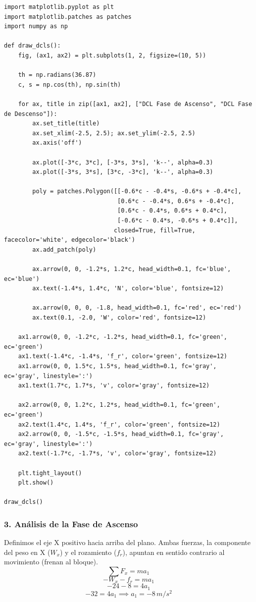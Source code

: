 \documentclass[12pt, a4paper]{article}
\begin{document}
\begin{lstlisting}
import matplotlib.pyplot as plt
import matplotlib.patches as patches
import numpy as np

def draw_dcls():
    fig, (ax1, ax2) = plt.subplots(1, 2, figsize=(10, 5))
    
    th = np.radians(36.87)
    c, s = np.cos(th), np.sin(th)
    
    for ax, title in zip([ax1, ax2], ["DCL Fase de Ascenso", "DCL Fase de Descenso"]):
        ax.set_title(title)
        ax.set_xlim(-2.5, 2.5); ax.set_ylim(-2.5, 2.5)
        ax.axis('off')
        
        ax.plot([-3*c, 3*c], [-3*s, 3*s], 'k--', alpha=0.3)
        ax.plot([-3*s, 3*s], [3*c, -3*c], 'k--', alpha=0.3)
        
        poly = patches.Polygon([[-0.6*c - -0.4*s, -0.6*s + -0.4*c], 
                                [0.6*c - -0.4*s, 0.6*s + -0.4*c], 
                                [0.6*c - 0.4*s, 0.6*s + 0.4*c], 
                                [-0.6*c - 0.4*s, -0.6*s + 0.4*c]], 
                               closed=True, fill=True, facecolor='white', edgecolor='black')
        ax.add_patch(poly)
        
        ax.arrow(0, 0, -1.2*s, 1.2*c, head_width=0.1, fc='blue', ec='blue')
        ax.text(-1.4*s, 1.4*c, 'N', color='blue', fontsize=12)
        
        ax.arrow(0, 0, 0, -1.8, head_width=0.1, fc='red', ec='red')
        ax.text(0.1, -2.0, 'W', color='red', fontsize=12)
        
    ax1.arrow(0, 0, -1.2*c, -1.2*s, head_width=0.1, fc='green', ec='green')
    ax1.text(-1.4*c, -1.4*s, 'f_r', color='green', fontsize=12)
    ax1.arrow(0, 0, 1.5*c, 1.5*s, head_width=0.1, fc='gray', ec='gray', linestyle=':')
    ax1.text(1.7*c, 1.7*s, 'v', color='gray', fontsize=12)
    
    ax2.arrow(0, 0, 1.2*c, 1.2*s, head_width=0.1, fc='green', ec='green')
    ax2.text(1.4*c, 1.4*s, 'f_r', color='green', fontsize=12)
    ax2.arrow(0, 0, -1.5*c, -1.5*s, head_width=0.1, fc='gray', ec='gray', linestyle=':')
    ax2.text(-1.7*c, -1.7*s, 'v', color='gray', fontsize=12)

    plt.tight_layout()
    plt.show()

draw_dcls()
\end{lstlisting}

\subsubsection*{3. Análisis de la Fase de Ascenso}
Definimos el eje X positivo hacia arriba del plano. Ambas fuerzas, la componente del peso en X ($W_x$) y el rozamiento ($f_r$), apuntan en sentido contrario al movimiento (frenan al bloque).
$$ \sum F_x = m a_1 $$
$$ - W_x - f_r = m a_1 $$
$$ - 24 - 8 = 4 a_1 $$
$$ - 32 = 4 a_1 \implies a_1 = -8 \, \si{m/s^2} $$
\end{document}
